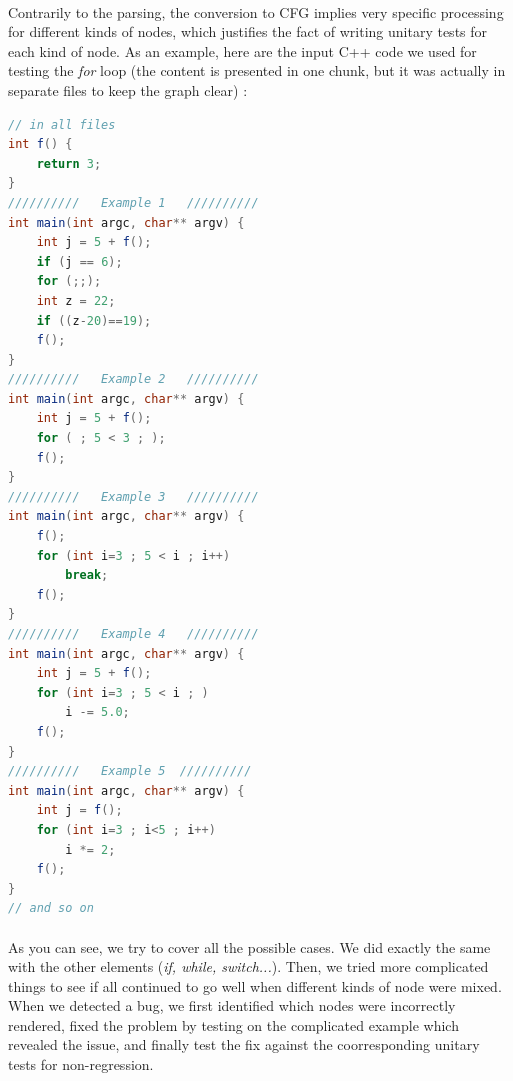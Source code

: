 \documentclass{report}
\begin{document}
\paragraph{}
\hspace{4mm}Contrarily to the parsing, the conversion to CFG implies very specific processing for different kinds of nodes,
which justifies the fact of writing unitary tests for each kind of node. As an example, here are the input C++ code we used for testing the \textit{for} loop 
(the content is presented in one chunk, but it was actually in separate files to keep the graph clear) :

\begin{lstlisting}[language=java]
// in all files 
int f() {
    return 3;
}
//////////   Example 1   //////////
int main(int argc, char** argv) {
    int j = 5 + f();
    if (j == 6);
    for (;;);
    int z = 22;
    if ((z-20)==19);
    f();
}
//////////   Example 2   //////////
int main(int argc, char** argv) {
    int j = 5 + f();
    for ( ; 5 < 3 ; );
    f();
}
//////////   Example 3   //////////
int main(int argc, char** argv) {
    f();
    for (int i=3 ; 5 < i ; i++)
        break;
    f();
}
//////////   Example 4   //////////
int main(int argc, char** argv) {
    int j = 5 + f();
    for (int i=3 ; 5 < i ; )
        i -= 5.0;
    f();
}
//////////   Example 5  //////////
int main(int argc, char** argv) {
    int j = f();
    for (int i=3 ; i<5 ; i++)
        i *= 2;
    f();
}
// and so on
\end{lstlisting}
\paragraph{}
\hspace{4mm}As you can see, we try to cover all the possible cases. We did exactly the same with the other elements (\textit{if, while, switch...}).
Then, we tried more complicated things to see if all continued to go well when different kinds of node were mixed. When we detected a bug,
we first identified which nodes were incorrectly rendered, fixed the problem by testing on the complicated example which revealed the issue, and finally
test the fix against the coorresponding unitary tests for non-regression.
\end{document}
